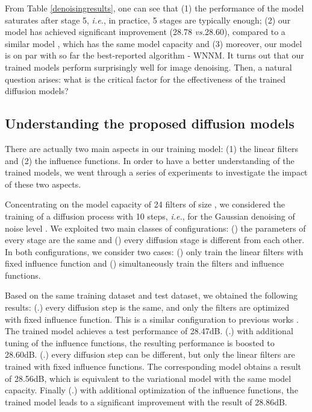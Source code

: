 \documentclass[10pt,journal,compsoc]{IEEEtran}
\newcommand{\ie}{\emph{i.e.}}
\newcommand{\vs}{\emph{vs.}}
\begin{document}
\begin{comment}
Concerning the performance of our  models, we find that joint training usually leads to 
an improvement of about 0.1dB in the cases of . 
\end{comment}


From Table \ref{denoisingresults}, one can see that 
(1) the performance of the  model saturates 
after stage 5, \ie, in practice, 5 stages are typically enough; (2) our 
 model has achieved significant improvement (28.78 \vs 28.60), 
compared to a similar model , which has the same model capacity and 
(3) moreover, our  model is on par with so far the best-reported algorithm - WNNM. It turns out that our trained models perform 
surprisingly well 
for image denoising. Then, 
a natural question arises: what is the critical factor for the effectiveness 
of the trained diffusion models? 

\subsection{Understanding the proposed diffusion models} 
There are actually two main aspects in 
our training model: (1) the linear filters and (2) the influence functions. In order to have a better understanding of the trained 
models, we went through a series of experiments to investigate the impact of these two aspects. 

Concentrating on the model capacity of 24 filters of size , 
we considered the training of a diffusion process with 10 steps, \ie,  for the Gaussian denoising of noise level . 
We exploited two main classes of configurations: 
({\color{blue}{A}}) the parameters of every stage are the same and 
({\color{blue}{B}}) every diffusion stage is different from each other. In both configurations, 
we consider two cases: ({\color{blue}{I}}) only train the linear filters with fixed influence 
function  and ({\color{blue}{II}}) simultaneously 
train the filters and influence functions. 

Based on the same training dataset and test dataset, we obtained the following results: 
({\color{blue}{A}}.{\color{blue}{I}}) every diffusion step is the same, and only the filters are optimized with fixed influence 
function. This is a similar configuration to previous works \cite{Barbu2009, DomkeAISTATS2012}. 
The trained model achieves a test performance of 28.47dB. 
({\color{blue}{A}}.{\color{blue}{II}}) with additional tuning of the influence functions, the resulting performance  is boosted to 
28.60dB. ({\color{blue}{B}}.{\color{blue}{I}}) every diffusion step can be different, but only the linear filters are trained with fixed 
influence functions. The corresponding model obtains a result of 28.56dB, which is equivalent to 
the variational model \cite{ChenPRB13} with the same model capacity. Finally ({\color{blue}{B}}.{\color{blue}{II}}) 
with additional optimization of the influence functions, the trained model leads to a significant improvement with the result of 
28.86dB. 
\end{document}
